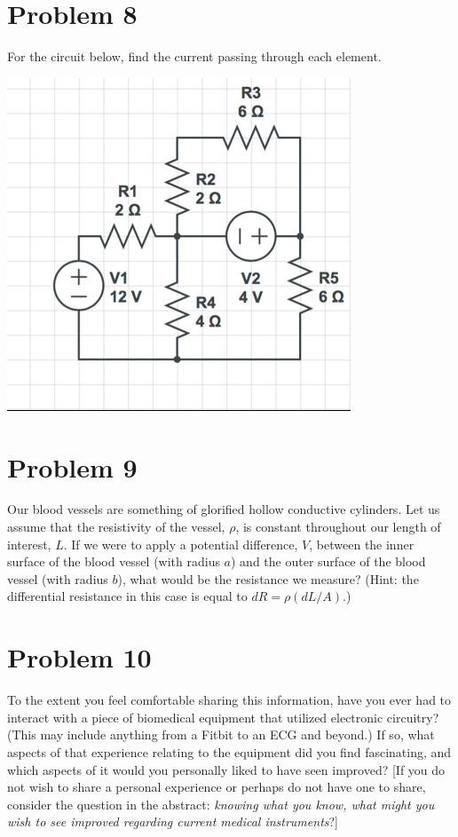 \documentclass[11pt]{book}
\begin{document}
\section{Problem 8}
For the circuit below, find the current passing through each element.

\begin{center}\includegraphics{figures/hw2.08.png}\end{center}

\section{Problem 9}
Our blood vessels are something of glorified hollow conductive cylinders. Let us assume that the resistivity of the vessel, $\rho$, is constant throughout our length of interest, $L$. If we were to apply a potential difference, $V$, between the inner surface of the blood vessel (with radius $a$) and the outer surface of the blood vessel (with radius $b$), what would be the resistance we measure? (Hint: the differential resistance in this case is equal to $dR = \rho(dL/A)$.)

\section{Problem 10}
To the extent you feel comfortable sharing this information, have you ever had to interact with a piece of biomedical equipment that utilized electronic circuitry? (This may include anything from a Fitbit to an ECG and beyond.) If so, what aspects of that experience relating to the equipment did you find fascinating, and which aspects of it would you personally liked to have seen improved? [If you do not wish to share a personal experience or perhaps do not have one to share, consider the question in the abstract: \textit{knowing what you know, what might you wish to see improved regarding current medical instruments}?]
\end{document}
